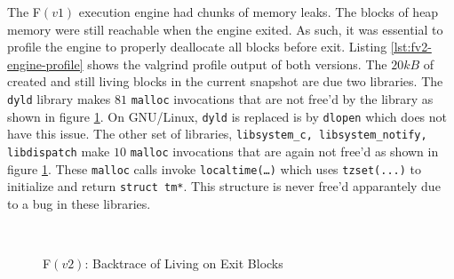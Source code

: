 The F$(v1)$ execution engine had chunks of memory leaks. The blocks of heap
memory were still reachable when the engine exited. As such, it was essential
to profile the engine to properly deallocate all blocks before exit. Listing
\ref{lst:fv2-engine-profile} shows the valgrind profile output of both
versions.  The $20kB$ of created and still living blocks in the current
snapshot are due two libraries. The \texttt{dyld} library makes $81$
\texttt{malloc} invocations that are not free'd by the library as shown in
figure \ref{fig:profile-invocations}. On GNU/Linux, \texttt{dyld} is replaced
is by \texttt{dlopen} which does not have this issue. The other set of
libraries, \texttt{libsystem\_c, libsystem\_notify, libdispatch} make $10$
\texttt{malloc} invocations that are again not free'd as shown in figure
\ref{fig:profile-invocations}.  These \texttt{malloc} calls invoke
\texttt{localtime(\ldots)} which uses \texttt{tzset(...)} to initialize and
return \texttt{struct tm*}. This structure is never free'd apparantely due to
a bug in these libraries.

\begin{figure}[ht!]
\centering
{}\quad
{}\\
\caption{F$(v2)$: Backtrace of Living on Exit Blocks}
\label{fig:profile-invocations}
\end{figure}


